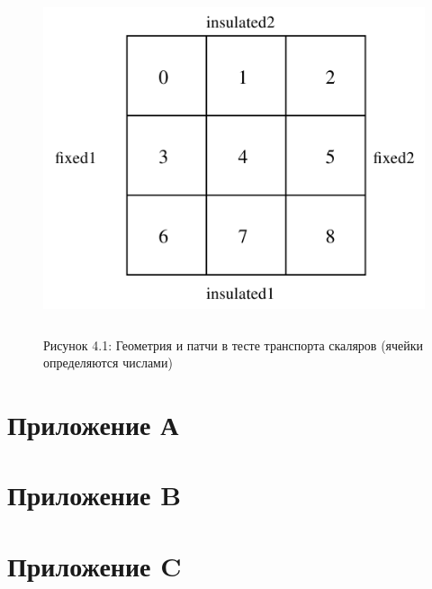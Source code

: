 \documentclass[a4paper,10pt]{book}
\begin{document}
% 	
% 
\begin{figure}[h]
 \centering
 \includegraphics[width=491,height=387]{Figure4-1.png}
 \caption{Рисунок 4.1: Геометрия и патчи в тесте транспорта скаляров (ячейки определяются числами)}
 \label{fig:4.1}
\end{figure}


\section{Приложение А}
\label{sec:PrilA}

\section{Приложение B}
\label{sec:PrilB}

\section{Приложение C}
\label{sec:PrilC}
\end{document}
